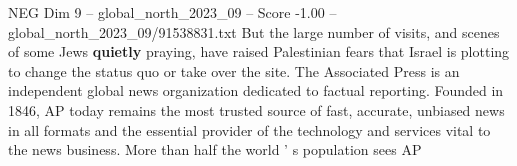 \begin{textsample}{NEG Dim 9 – global\_north\_2023\_09 – Score -1.00 – global\_north\_2023\_09/91538831.txt}
But the large number of visits, and scenes of some Jews \textbf{quietly} praying, have raised Palestinian fears that Israel is plotting to change the status quo or take over the site.
The Associated Press is an independent global news organization dedicated to factual reporting.
Founded in 1846, AP today remains the most trusted source of fast, accurate, unbiased news in all formats and the essential provider of the technology and services vital to the news business.
More than half the world ' s population sees AP

\end{textsample}
